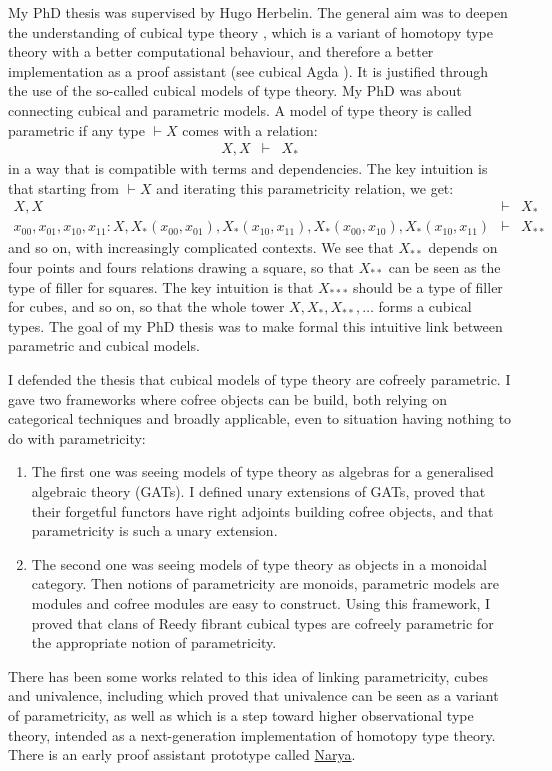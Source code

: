 \documentclass{article}
\begin{document}
My PhD thesis was supervised by Hugo Herbelin. The general aim was to deepen the understanding of cubical type theory \cite{cohen2016cubical}, which is a variant of homotopy type theory with a better computational behaviour, and therefore a better implementation as a proof assistant (see cubical Agda \cite{vezzosi2019cubical}). It is justified through the use of the so-called cubical models of type theory. My PhD was about connecting cubical and parametric models. A model of type theory is called parametric if any type $\vdash X$ comes with a relation: 
\begin{eqnarray}
X,X &\vdash& X_*\nonumber
\end{eqnarray}
in a way that is compatible with terms and dependencies. The key intuition is that starting from $\vdash X$ and iterating this parametricity relation, we get:
\begin{eqnarray}
X,X &\vdash& X_*\nonumber\\
x_{00},x_{01},x_{10},x_{11}:X,X_*(x_{00},x_{01}),X_*(x_{10},x_{11}),X_*(x_{00},x_{10}),X_*(x_{10},x_{11}) &\vdash& X_{**}\nonumber
\end{eqnarray}
and so on, with increasingly complicated contexts. We see that $X_{**}$ depends on four points and fours relations drawing a square, so that $X_{**}$ can be seen as the type of filler for squares. The key intuition is that $X_{***}$ should be a type of filler for cubes, and so on, so that the whole tower $X,X_*,X_{**},\ldots$ forms a cubical types. The goal of my PhD thesis was to make formal this intuitive link between parametric and cubical models.

I defended the thesis that cubical models of type theory are cofreely parametric. I gave two frameworks where cofree objects can be build, both relying on categorical techniques and broadly applicable, even to situation having nothing to do with parametricity:
\begin{enumerate}
\item The first one was seeing models of type theory as algebras for a generalised algebraic theory (GATs). I defined unary extensions of GATs, proved that their forgetful functors have right adjoints building cofree objects, and that parametricity is such a unary extension. 
\item The second one was seeing models of type theory as objects in a monoidal category. Then notions of parametricity are monoids, parametric models are modules and cofree modules are easy to construct. Using this framework, I proved that clans of Reedy fibrant cubical types are cofreely parametric for the appropriate notion of parametricity.
\end{enumerate}
There has been some works related to this idea of linking parametricity, cubes and univalence, including \cite{tabareau2021marriage} which proved that univalence can be seen as a variant of parametricity, as well as \cite{altenkirch2024internal} which is a step toward higher observational type theory, intended as a next-generation implementation of homotopy type theory. There is an early proof assistant prototype  called \href{https://github.com/gwaithimirdain/narya}{Narya}.
\end{document}
